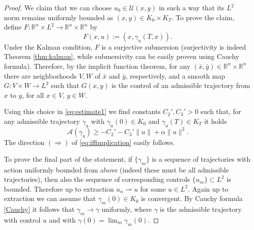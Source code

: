 \documentclass[reqno]{amsart}
\theoremstyle{plain}
\theoremstyle{definition}
\theoremstyle{remark}
\newcommand{\R}{\mathbb{R}}
\begin{document}
\begin{proof}
We claim that we can choose $u_0\in\mathcal{U}(x,y)$ in such a way that its $L^2$ norm remains uniformly bounded as $(x,y)\in K_0\times K_T$. To prove the claim, define $F: \R^n\times L^2 \to \R^n\times \R^n$  by
\begin{equation}
F(x,u):=(x,\gamma_u(T,x)).
\end{equation}
Under the Kalman condition, $F$ is a surjective submersion (surjectivity is indeed Theorem \ref{thm:kalman}, while submersivity can be easily proven using Cauchy formula). Therefore, by the implicit function theorem, for any $(\bar{x},\bar{y})\in \R^n\times \R^n$ there are neighborhoods $V,W$ of $\bar{x}$ and $\bar{y}$, respectively, and a smooth map $G: V\times W \to L^2$ such that $G(x,y)$ is the control of an admissible trajectory from $x$ to $y$, for all $x\in V$, $y\in W$.

Using this choice in \eqref{eq:estimate1} we find constants $C_2',C_3'>0$ such that, for any admissible trajectory $\gamma_u$ with $\gamma_u(0) \in K_0$ and $\gamma_u(T)\in K_T$ it holds
\begin{equation}
    \mathcal{A}(\gamma_u) \geq - C_2' - C_3'\|u\| + \alpha\|u\|^2.
\end{equation}
The direction $(\Rightarrow)$  of \eqref{eq:iffimplication} easily follows.

To prove the final part of the statement, if $\{\gamma_m\}$ is a sequence of trajectories with action uniformly bounded from above (indeed these must be all admissible trajectories), then also the sequence of corresponding controls $\{u_m\}\subset L^2$ is bounded. Therefore up to extraction $u_n \rightharpoonup u$ for some $u\in L^2$. Again up to extraction we can assume that $\gamma_m(0) \in K_0$ is convergent. By Cauchy formula \eqref{Cauchy} it follows that $\gamma_m \to \gamma$ uniformly, where $\gamma$ is the admissible trajectory with control $u$ and with $\gamma(0) = \lim_m \gamma_m(0)$.
\end{proof}
    
\end{document}

